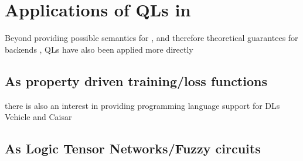 \section{Applications of QLs in \InAI{}}
Beyond providing possible semantics for \InAI{}, and therefore theoretical guarantees for backends \yada, QLs have also been applied more directly \yada

\subsection{As property driven training/loss functions}
\yada there is also an interest in providing programming language support for DLs \yada Vehicle and Caisar \yada
\subsection{As Logic Tensor Networks/Fuzzy circuits}








\TODO
